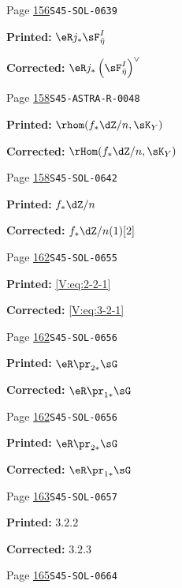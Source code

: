 \begin{description}
\smallskip
\item[\hypertarget{apparatus:EN-0091}{91}] Page \hyperlink{printpage:en:156}{156}\quad\texttt{S45-SOL-0639}
\par\noindent\textbf{Printed:} \(\eR j_\ast \sF_{\bar\eta}^I\)
\par\noindent\textbf{Corrected:} \(\eR j_\ast\left(\sF_{\bar\eta}^I\right)^\vee\)
\smallskip
\item[\hypertarget{apparatus:EN-0092}{92}] Page \hyperlink{printpage:en:158}{158}\quad\texttt{S45-ASTRA-R-0048}
\par\noindent\textbf{Printed:} \(\rhom(f_\ast\dZ/n,\sK_Y)\)
\par\noindent\textbf{Corrected:} \(\rHom(f_\ast\dZ/n,\sK_Y)\)
\smallskip
\item[\hypertarget{apparatus:EN-0093}{93}] Page \hyperlink{printpage:en:158}{158}\quad\texttt{S45-SOL-0642}
\par\noindent\textbf{Printed:} \(f_\ast\dZ/n\)
\par\noindent\textbf{Corrected:} \(f_\ast\dZ/n(1)[2]\)
\smallskip
\item[\hypertarget{apparatus:EN-0094}{94}] Page \hyperlink{printpage:en:162}{162}\quad\texttt{S45-SOL-0655}
\par\noindent\textbf{Printed:} \eqref{V:eq:2-2-1}
\par\noindent\textbf{Corrected:} \eqref{V:eq:3-2-1}
\smallskip
\item[\hypertarget{apparatus:EN-0095}{95}] Page \hyperlink{printpage:en:162}{162}\quad\texttt{S45-SOL-0656}
\par\noindent\textbf{Printed:} \(\eR \pr_{2\ast}\sG\)
\par\noindent\textbf{Corrected:} \(\eR \pr_{1\ast}\sG\)
\smallskip
\item[\hypertarget{apparatus:EN-0096}{96}] Page \hyperlink{printpage:en:162}{162}\quad\texttt{S45-SOL-0656}
\par\noindent\textbf{Printed:} \(\eR \pr_{2\ast}\sG\)
\par\noindent\textbf{Corrected:} \(\eR \pr_{1\ast}\sG\)
\smallskip
\item[\hypertarget{apparatus:EN-0097}{97}] Page \hyperlink{printpage:en:163}{163}\quad\texttt{S45-SOL-0657}
\par\noindent\textbf{Printed:} \(3.2.2\)
\par\noindent\textbf{Corrected:} \(3.2.3\)
\smallskip
\item[\hypertarget{apparatus:EN-0098}{98}] Page \hyperlink{printpage:en:165}{165}\quad\texttt{S45-SOL-0664}

\end{description}

